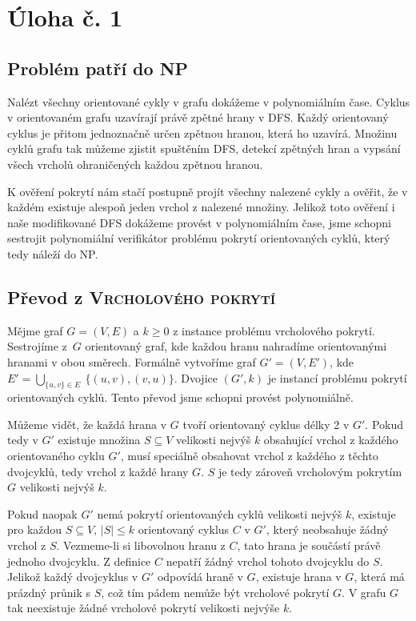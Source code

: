 \documentclass{scrartcl}
\begin{document}
\section*{Úloha č. 1}
\subsection*{Problém patří do NP}
Nalézt všechny orientované cykly v grafu dokážeme v polynomiálním čase. Cyklus v orientovaném grafu uzavírají právě zpětné hrany v DFS. Každý orientovaný cyklus je přitom jednoznačně určen zpětnou hranou, která ho uzavírá. Množinu cyklů grafu tak můžeme zjistit spuštěním DFS, detekcí zpětných hran a vypsání všech vrcholů ohraničených každou zpětnou hranou.

K ověření pokrytí nám stačí postupně projít všechny nalezené cykly a ověřit, že v každém existuje alespoň jeden vrchol z nalezené množiny. Jelikož toto ověření i naše modifikované DFS dokážeme provést v polynomiálním čase, jsme schopni sestrojit polynomiální verifikátor problému pokrytí orientovaných cyklů, který tedy náleží do NP.

\subsection*{Převod z \textsc{Vrcholového pokrytí}}
Mějme graf $G=(V,E)$ a $k \geq 0$ z instance problému vrcholového pokrytí. Sestrojíme z~$G$ orientovaný graf, kde každou hranu nahradíme orientovanými hranami v obou směrech. Formálně vytvoříme graf $G'=(V,E')$, kde $E'=\bigcup_{\{u,v\}\in E}\ \{(u,v),(v,u)\}$. Dvojice $(G', k)$ je instancí problému pokrytí orientovaných cyklů. Tento převod jsme schopni provést polynomiálně.

Můžeme vidět, že každá hrana v $G$ tvoří orientovaný cyklus délky 2 v $G'$. Pokud tedy v $G'$ existuje množina $S \subseteq V$ velikosti nejvýš $k$ obsahující vrchol z každého orientovaného cyklu $G'$, musí speciálně obsahovat vrchol z každého z těchto dvojcyklů, tedy vrchol z každé hrany $G$. $S$ je tedy zároveň vrcholovým pokrytím $G$ velikosti nejvýš $k$.

Pokud naopak $G'$ nemá pokrytí orientovaných cyklů velikosti nejvýš $k$, existuje pro každou $S \subseteq V,\,\vert S\vert \leq k$ orientovaný cyklus $C$ v $G'$, který neobsahuje žádný vrchol z $S$. Vezmeme-li si libovolnou hranu z $C$, tato hrana je součástí právě jednoho dvojcyklu. Z definice $C$ nepatří žádný vrchol tohoto dvojcyklu do $S$. Jelikož každý dvojcyklus v $G'$ odpovídá  hraně v $G$, existuje hrana v $G$, která má prázdný průnik s $S$, což tím pádem nemůže být vrcholové pokrytí $G$. V grafu $G$ tak neexistuje žádné vrcholové pokrytí velikosti nejvýše $k$.
\end{document}
